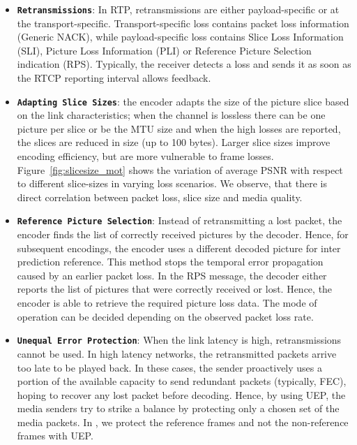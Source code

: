 \begin{itemize}
\setlength{\itemsep}{0pt}

  \item \textbf{\texttt{Retransmissions}}: In RTP, retransmissions are either
  payload-specific or at the transport-specific. Transport-specific loss
  contains packet loss information (Generic NACK), while payload-specific loss
  contains Slice Loss Information (SLI), Picture Loss Information (PLI) or
  Reference Picture Selection indication (RPS). Typically, the receiver
  detects a loss and sends it as soon as the RTCP reporting interval allows
  feedback.

  \item \textbf{\texttt{Adapting Slice Sizes}}: the encoder adapts the size of
  the picture slice based on the link characteristics; when the channel is
  lossless there can be one picture per slice or be the MTU size and when the
  high losses are reported, the slices are reduced in size (up to 100 bytes).
  Larger slice sizes improve encoding efficiency, but are more vulnerable to
  frame losses. Figure~\ref{fig:slicesize_mot} shows the variation of average
  PSNR with respect to different slice-sizes in varying loss scenarios. We
  observe, that there is direct correlation between packet loss, slice
  size and media quality.

  \item \textbf{\texttt{Reference Picture Selection}}: Instead of
  retransmitting a lost packet, the encoder finds the list of correctly
  received pictures by the decoder. Hence, for subsequent encodings, the
  encoder uses a different decoded picture for inter prediction reference.
  This method stops the temporal error propagation caused by an earlier packet
  loss. In the RPS message, the decoder either reports the list of pictures
  that were correctly received or lost. Hence, the encoder is able to retrieve
  the required picture loss data. The mode of operation can be decided
  depending on the observed packet loss rate.

  \item \textbf{\texttt{Unequal Error Protection}}: When the link latency is
  high, retransmissions cannot be used. In high latency networks, the
  retransmitted packets arrive too late to be played back. In these cases, the
  sender proactively uses a portion of the available capacity to send
  redundant packets (typically, FEC), hoping to recover any lost packet before
  decoding. Hence, by using UEP, the media senders try to strike a balance by
  protecting only a chosen set of the media packets. In , we
  protect the reference frames and not the non-reference frames with UEP.

\end{itemize}

